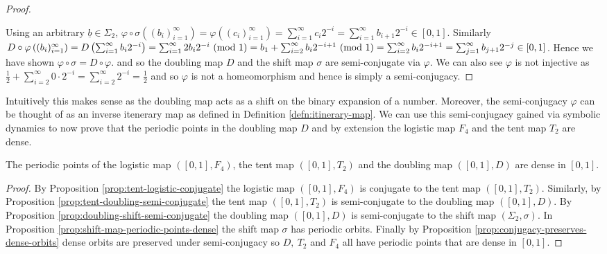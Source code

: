 \begin{prop}
\begin{proof}
\begin{center}
        \end{center}
        Using an arbitrary $\underline{b} \in \Sigma_2$, $\varphi \circ \sigma\left((b_i)_{i=1}^{\infty}\right) = \varphi\left((c_i)_{i=1}^{\infty}\right) = \sum_{i=1}^{\infty} c_i2^{-i} = \sum_{i=1}^{\infty} b_{i+1}2^{-i} \in [0, 1]$. Similarly $D \circ \varphi\left((b_i)_{i=1}^{\infty}\right) = D\left(\sum_{i=1}^{\infty} b_i2^{-i}\right) = \sum_{i=1}^{\infty} 2b_i2^{-i} \ (\mathrm{mod}\ 1) = b_1 + \sum_{i=2}^{\infty} b_i2^{-i+1} \ (\mathrm{mod}\ 1) = \sum_{i=2}^{\infty} b_i2^{-i+1} = \sum_{j=1}^{\infty} b_{j+1}2^{-j} \in [0, 1]$. Hence we have shown $\varphi \circ \sigma = D \circ \varphi$. and so the doubling map $D$ and the shift map $\sigma$ are semi-conjugate via $\varphi$. We can also see $\varphi$ is not injective as $\frac{1}{2} + \sum_{i=2}^{\infty}0 \cdot 2^{-i} = \sum_{i=2}^{\infty}2^{-i} = \frac{1}{2}$ and so $\varphi$ is not a homeomorphism and hence is simply a semi-conjugacy. 
    \end{proof}
\end{prop}

Intuitively this makes sense as the doubling map acts as a shift on the binary expansion of a number. Moreover, the semi-conjugacy $\varphi$ can be thought of as an inverse itenerary map as defined in Definition \ref{defn:itinerary-map}. We can use this semi-conjugacy gained via symbolic dynamics to now prove that the periodic points in the doubling map $D$ and by extension the logistic map $F_4$ and the tent map $T_2$ are dense.

\begin{prop} \label{prop:logisitc-tent-doubling-periodic-dense}
    The periodic points of the logistic map $([0, 1], F_4)$, the tent map $([0, 1], T_2)$ and the doubling map $([0, 1], D)$ are dense in $[0, 1]$.
    \begin{proof}
    By Proposition \ref{prop:tent-logistic-conjugate} the logistic map $([0, 1], F_4)$ is conjugate to the tent map $([0, 1], T_2)$. Similarly, by Proposition \ref{prop:tent-doubling-semi-conjugate} the tent map $([0, 1], T_2)$ is semi-conjugate to the doubling map $([0, 1], D)$. By Proposition \ref{prop:doubling-shift-semi-conjugate} the doubling map $([0, 1], D)$ is semi-conjugate to the shift map $(\Sigma_2, \sigma)$. In Proposition \ref{prop:shift-map-periodic-points-dense} the shift map $\sigma$ has periodic orbits. Finally by Proposition \ref{prop:conjugacy-preserves-dense-orbits} dense orbits are preserved under semi-conjugacy so $D, \ T_2$ and $F_4$ all have periodic points that are dense in $[0, 1]$.
    \end{proof}
\end{prop}

